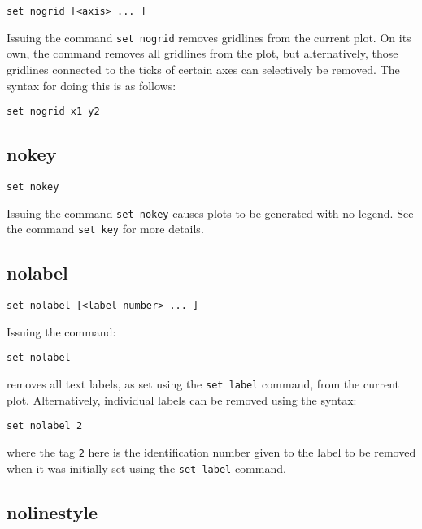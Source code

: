 \begin{verbatim}
set nogrid [<axis> ... ]
\end{verbatim}

Issuing the command {\tt set nogrid} removes gridlines from the current plot. On
its own, the command removes all gridlines from the plot, but alternatively,
those gridlines connected to the ticks of certain axes can selectively be
removed.  The syntax for doing this is as follows:

\begin{verbatim}
set nogrid x1 y2
\end{verbatim}


\subsection{nokey}

\begin{verbatim}
set nokey
\end{verbatim}

Issuing the command {\tt set nokey} causes plots to be generated with no legend.
See the command {\tt set key} for more details.


\subsection{nolabel}

\begin{verbatim}
set nolabel [<label number> ... ]
\end{verbatim}

Issuing the command:

\begin{verbatim}
set nolabel
\end{verbatim}

\noindent removes all text labels, as set using the {\tt set label} command,
from the current plot. Alternatively, individual labels can be removed using
the syntax:

\begin{verbatim}
set nolabel 2
\end{verbatim}

\noindent where the tag {\tt 2} here is the identification number given to
the label to be removed when it was initially set using the {\tt set label}
command.

\subsection{nolinestyle}

